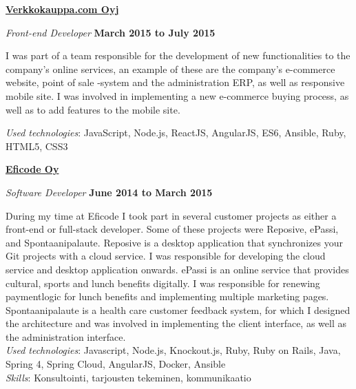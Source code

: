 \documentclass[10pt,english,a4paper]{article}
\newenvironment{outerlist}[1][\enskip\textbullet]%
        {\begin{itemize}[#1]}{\end{itemize}%
         \vspace{-.6\baselineskip}}
\newenvironment{innerlist}[1][\enskip\textbullet]%
        {\begin{compactitem}[#1]}{\end{compactitem}}
\newcommand{\blankline}{\quad\pagebreak[2]}
\begin{document}
\href{http://verkkokauppa.com/}{\textbf{Verkkokauppa.com Oyj}}
\begin{outerlist}

  \item[] \textit{Front-end Developer}%
  \hfill \textbf{March 2015 to July 2015}
  \begin{innerlist}
    \item

    I was part of a team responsible for the development of new functionalities to the company's online services, an example of these are the company's e-commerce website, point of sale -system and the administration ERP, as well as responsive mobile site.
    I was involved in implementing a new e-commerce buying process, as well as to add features to the mobile site.

    \emph{Used technologies}: JavaScript, Node.js, ReactJS, AngularJS, ES6, Ansible, Ruby, HTML5, CSS3\\
  \end{innerlist}
\end{outerlist}
\blankline

\href{http://eficode.fi/}{\textbf{Eficode Oy}}
\begin{outerlist}

  \item[] \textit{Software Developer}%
  \hfill \textbf{June 2014 to March 2015}
  \begin{innerlist}
    \item
      During my time at Eficode I took part in several customer projects as either a front-end or full-stack developer. Some of these projects were Reposive, ePassi, and Spontaanipalaute.
      Reposive is a desktop application that synchronizes your Git projects with a cloud service. I was responsible for developing the cloud service and desktop application onwards.
      ePassi is an online service that provides cultural, sports and lunch benefits digitally. I was responsible for renewing paymentlogic for lunch benefits and implementing multiple marketing pages.
      Spontaanipalaute is a health care customer feedback system, for which I designed the architecture and was involved in implementing the client interface, as well as the administration interface.\\

    \emph{Used technologies}: Javascript, Node.js, Knockout.js, Ruby, Ruby on Rails, Java, Spring 4, Spring Cloud, AngularJS, Docker, Ansible\\
    \emph{Skills}: Konsultointi, tarjousten tekeminen, kommunikaatio
  \end{innerlist}
\end{outerlist}
\blankline
\end{document}
